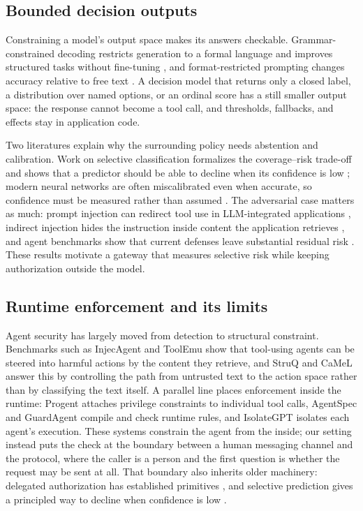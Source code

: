 \documentclass[runningheads,a4paper]{llncs}
\begin{document}
\subsection{Bounded decision outputs}

Constraining a model's output space makes its answers checkable. Grammar-constrained decoding restricts generation to a formal language and improves structured tasks without fine-tuning \cite{geng2023grammar}, and format-restricted prompting changes accuracy relative to free text \cite{tam2024format}. A decision model that returns only a closed label, a distribution over named options, or an ordinal score has a still smaller output space: the response cannot become a tool call, and thresholds, fallbacks, and effects stay in application code.

Two literatures explain why the surrounding policy needs abstention and calibration. Work on selective classification formalizes the coverage--risk trade-off and shows that a predictor should be able to decline when its confidence is low \cite{geifman2017selective}; modern neural networks are often miscalibrated even when accurate, so confidence must be measured rather than assumed \cite{guo2017calibration}. The adversarial case matters as much: prompt injection can redirect tool use in LLM-integrated applications \cite{greshake2023indirect}, indirect injection hides the instruction inside content the application retrieves \cite{liu2024promptinjection}, and agent benchmarks show that current defenses leave substantial residual risk \cite{debenedetti2024agentdojo}. These results motivate a gateway that measures selective risk while keeping authorization outside the model.

\subsection{Runtime enforcement and its limits}

Agent security has largely moved from detection to structural constraint. Benchmarks such as InjecAgent \cite{injecagent2024} and ToolEmu \cite{toolemu2023} show that tool-using agents can be steered into harmful actions by the content they retrieve, and StruQ \cite{struq2024} and CaMeL \cite{camel2025} answer this by controlling the path from untrusted text to the action space rather than by classifying the text itself. A parallel line places enforcement inside the runtime: Progent \cite{progent2025} attaches privilege constraints to individual tool calls, AgentSpec \cite{agentspec2025} and GuardAgent \cite{guardagent2024} compile and check runtime rules, and IsolateGPT \cite{isolategpt2024} isolates each agent's execution. These systems constrain the agent from the inside; our setting instead puts the check at the boundary between a human messaging channel and the protocol, where the caller is a person and the first question is whether the request may be sent at all. That boundary also inherits older machinery: delegated authorization has established primitives \cite{oauth2012}, and selective prediction gives a principled way to decline when confidence is low \cite{conformal2021,geifman2017selective}.
\end{document}
